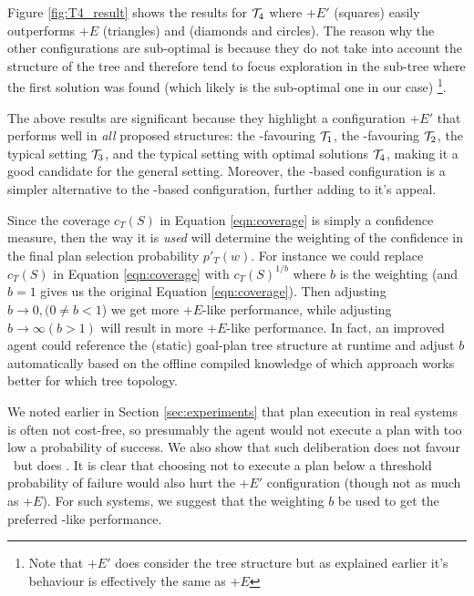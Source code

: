 Figure \ref{fig:T4_result} shows the results for ${\mathcal{T}}_4$ where \CL+$E'$ (squares)
easily outperforms \CL+$E$ (triangles) and \BUL (diamonds and circles). The
reason why the other configurations are sub-optimal is because they do not take
into account the structure of the tree and therefore tend to focus exploration in
the sub-tree where the first solution was found (which likely is the sub-optimal
one in our case) \footnote{Note that \BUL+$E'$ does consider the tree structure
but as explained earlier it's behaviour is effectively the same as \BUL+$E$}.


The above results are significant because they highlight a configuration \CL+$E'$ that performs well in \textit{all} proposed structures: the \CL-favouring ${\mathcal{T}}_1$, the \BUL-favouring ${\mathcal{T}}_2$, the typical setting ${\mathcal{T}}_3$, and the typical setting with optimal solutions ${\mathcal{T}}_4$, making it a good candidate for the general setting. Moreover, the \CL-based configuration is a simpler alternative to the \BUL-based configuration, further adding to it's appeal.

Since the
coverage $c_T(S)$ in Equation \ref{eqn:coverage} is simply a
confidence measure, then the way it is \textit{used} will determine
the weighting of the confidence in the final plan selection
probability $p'_T(w)$. For instance we could replace $c_T(S)$ in
Equation \ref{eqn:coverage} with $c_T(S)^{1/b}$ where $b$ is the
weighting (and $b=1$ gives us the original Equation
\ref{eqn:coverage}). Then adjusting $b \rightarrow 0, (0 \ne b < 1$)
we get more \BUL+$E$-like performance, while adjusting $b \rightarrow
\infty (b > 1)$ will result in more \CL+$E$-like performance. In fact,
an improved agent could reference the (static) goal-plan tree
structure at runtime and adjust $b$ automatically based on the offline
compiled knowledge of which approach works better for which tree
topology. 

We noted earlier in Section \ref{sec:experiments} that plan execution
in real systems is often not cost-free, so presumably the agent would
not execute a plan with too low a probability of success. We also show
that such deliberation does not favour \CL\ but does \BUL. It is clear
that choosing not to execute a plan below a threshold probability of
failure would also hurt the \CL+$E'$ configuration (though
not as much as \CL+$E$). For such systems, we suggest that the
weighting $b$ be used to get the preferred \BUL-like performance. 

